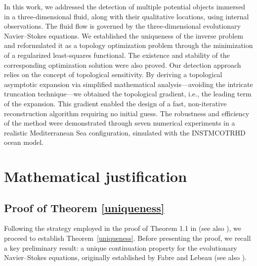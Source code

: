 \documentclass[a4paper,12pt,reqno,natbib]{amsart}
\begin{document}
In this work, we addressed the detection of multiple potential objects immersed in a three-dimensional fluid, along with their qualitative locations, using internal observations. The fluid flow is governed by the three-dimensional evolutionary Navier--Stokes equations. We established the uniqueness of the inverse problem and reformulated it as a topology optimization problem through the minimization of a regularized least-squares functional. The existence and stability of the corresponding optimization solution were also proved.  
Our detection approach relies on the concept of topological sensitivity. By deriving a topological asymptotic expansion via simplified mathematical analysis---avoiding the intricate truncation technique---we obtained the topological gradient, i.e., the leading term of the expansion. This gradient enabled the design of a fast, non-iterative reconstruction algorithm requiring no initial guess. The robustness and efficiency of the method were demonstrated through seven numerical experiments in a realistic Mediterranean Sea configuration, simulated with the \textsc{INSTMCOTRHD} ocean model.





















\section{Mathematical justification}\label{sec:jutification}












\subsection{Proof of Theorem \ref{uniqueness}}\label{sec:uniqueness}

Following the strategy employed in the proof of Theorem 1.1 in \cite{AlvarezIPPIP2005} (see also \cite{doubova2007identification}), we proceed to establish Theorem~\ref{uniqueness}. Before presenting the proof, we recall a key preliminary result: a unique continuation property for the evolutionary Navier--Stokes equations, originally established by Fabre and Lebeau \cite{fabre1996prolongement} (see also \cite[Theorem 2.3]{AlvarezIPPIP2005}).
\end{document}
